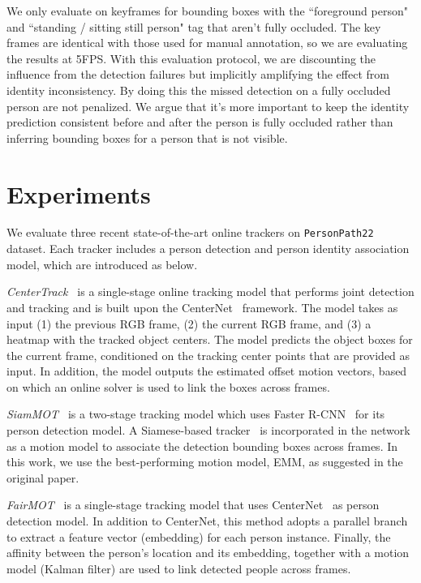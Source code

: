 \documentclass[runningheads]{llncs}
\begin{document}
We only evaluate on keyframes for bounding boxes with the ``foreground person" and ``standing / sitting still person" tag that aren't fully occluded. The key frames are identical with those used for manual annotation, so we are evaluating the results at 5FPS. With this evaluation protocol, we are discounting the influence from the detection failures but implicitly amplifying the effect from identity inconsistency. By doing this the missed detection on a fully occluded person are not penalized. We argue that it's more important to keep the identity prediction consistent before and after the person is fully occluded rather than inferring bounding boxes for a person that is not visible.








%
  
\section{Experiments}\label{sec:experiments}


We evaluate three recent state-of-the-art online trackers on \texttt{PersonPath22} dataset. Each tracker includes a person detection and person identity association model, which are introduced as below.


\textit{CenterTrack~\cite{centertrack}} is a single-stage online tracking model that performs joint detection and tracking and is built upon the CenterNet~\cite{centernet} framework. The model takes as input (1) the previous RGB frame, (2) the current RGB frame, and (3) a heatmap with the tracked object centers. The model predicts the object boxes for the current frame, conditioned on the tracking center points that are provided as input. In addition, the model outputs the estimated offset motion vectors, based on which an online solver is used to link the boxes across frames.


\textit{SiamMOT~\cite{siammot}} is a two-stage tracking model which uses Faster R-CNN~\cite{fasterrcnn} for its person detection model. A Siamese-based tracker~\cite{held2016learning,siamcar} is incorporated in the network as a motion model to associate the detection bounding boxes across frames. In this work, we use the best-performing motion model, EMM, as suggested in the original paper.


\textit{FairMOT~\cite{fairmot}} is a single-stage tracking model that uses CenterNet~\cite{centernet} as person detection model. In addition to CenterNet, this method adopts a parallel branch to extract a feature vector (embedding) for each person instance. Finally, the affinity between the person's location and its embedding, together with a motion model (Kalman filter) are used to link detected people across frames.
\end{document}
